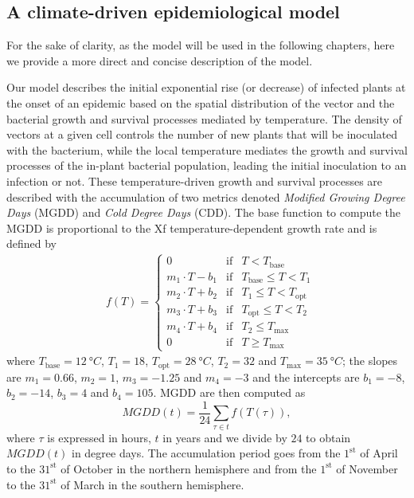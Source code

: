 \subsection{A climate-driven epidemiological model}

For the sake of clarity, as the model will be used in the following chapters,
here we provide a more direct and concise description of the model.

Our model describes the initial exponential rise (or decrease) of infected
plants at the onset of an epidemic based on the spatial distribution of the
vector and the bacterial growth and survival processes mediated by temperature.
The density of vectors at a given cell controls the number of new plants that
will be inoculated with the bacterium, while the local temperature mediates the
growth and survival processes of the in-plant bacterial population, leading the
initial inoculation to an infection or not. These temperature-driven growth and
survival processes are described with the accumulation of two metrics denoted
\textit{Modified Growing Degree Days} (MGDD) and \textit{Cold Degree Days}
(CDD). The base function to compute the MGDD is proportional to the Xf
temperature-dependent growth rate and is defined by
\begin{align*}
     & f(T)=\left\{\begin{array}{lll}
                       0                & \textrm{if} & T<T_{\textrm{base}}
                       \\
                       m_1\cdot T-b_1   & \textrm{if} & T_{\textrm{base}} \leq
                       T < T_1
                       \\
                       m_2\cdot T + b_2 & \textrm{if} & T_{1} \leq T <
                       T_{\textrm{opt}}
                       \\
                       m_3\cdot T + b_3 & \textrm{if} & T_{\textrm{opt}}
                       \leq T
                       < T_2
                       \\
                       m_4\cdot T + b_4 & \textrm{if} & T_2 \leq
                       T_{\textrm{max}}
                       \\
                       0                & \textrm{if} & T\geq T_{\textrm{max}}
                   \end{array}\right. \,
\end{align*}
where $T_{\textrm{base}}=\SI{12}{\degree C}$, $T_1=18$,
$T_{\textrm{opt}}=\SI{28}{\degree C}$,	$T_2=32$ and
$T_{\textrm{max}}=\SI{35}{\degree C}$; the slopes are $m_1= 0.66$, $m_2=1$,
$m_3=-1.25$ and $m_4=-3$ and the intercepts are $b_1=-8$, $b_2=-14$, $b_3=4$
and $b_4=105$. MGDD are then computed as
\begin{equation}\label{eq:MGDDdef}
    MGDD(t) = \frac{1}{24}\sum_{\tau \in t} f(T(\tau)),
\end{equation}
where $\tau$ is expressed in hours, $t$ in years and we divide by $24$ to
obtain $MGDD(t)$ in degree days. The accumulation period goes from the
$1^{\mathrm{st}}$ of April to the $31^{\mathrm{st}}$ of October in the northern
hemisphere and from the $1^{\mathrm{st}}$ of November to the $31^{\mathrm{st}}$
of March in the southern hemisphere.

